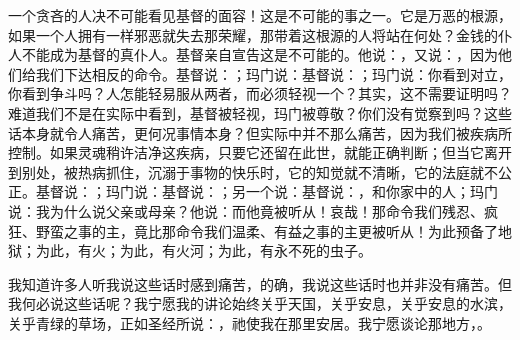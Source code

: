 一个贪吝的人决不可能看见基督的面容！这是不可能的事之一。它是万恶的根源，如果一个人拥有一样邪恶就失去那荣耀，那带着这根源的人将站在何处？金钱的仆人不能成为基督的真仆人。基督亲自宣告这是不可能的。他说：，又说：，因为他们给我们下达相反的命令。基督说：；玛门说：基督说：；玛门说：你看到对立，你看到争斗吗？人怎能轻易服从两者，而必须轻视一个？其实，这不需要证明吗？难道我们不是在实际中看到，基督被轻视，玛门被尊敬？你们没有觉察到吗？这些话本身就令人痛苦，更何况事情本身？但实际中并不那么痛苦，因为我们被疾病所控制。如果灵魂稍许洁净这疾病，只要它还留在此世，就能正确判断；但当它离开到别处，被热病抓住，沉溺于事物的快乐时，它的知觉就不清晰，它的法庭就不公正。基督说：；玛门说：基督说：；另一个说：基督说：，和你家中的人；玛门说：我为什么说父亲或母亲？他说：而他竟被听从！哀哉！那命令我们残忍、疯狂、野蛮之事的主，竟比那命令我们温柔、有益之事的主更被听从！为此预备了地狱；为此，有火；为此，有火河；为此，有永不死的虫子。\par

我知道许多人听我说这些话时感到痛苦，的确，我说这些话时也并非没有痛苦。但我何必说这些话呢？我宁愿我的讲论始终关乎天国，关乎安息，关乎安息的水滨，关乎青绿的草场，正如圣经所说：，祂使我在那里安居。我宁愿谈论那地方，。\par

